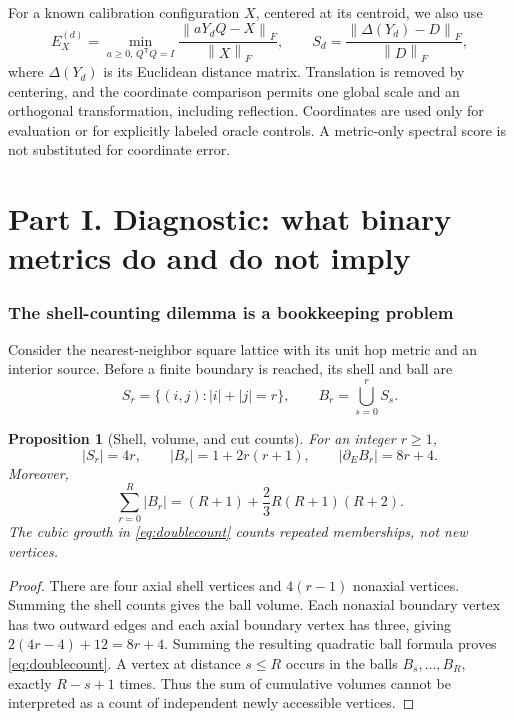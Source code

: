 \documentclass[11pt,letterpaper]{article}
\newtheorem{proposition}[theorem]{Proposition}
\theoremstyle{definition}
\theoremstyle{remark}
\newcommand{\norm}[1]{\left\lVert #1\right\rVert}
\begin{document}
For a known calibration configuration $X$, centered at its centroid, we also use
\begin{equation}
 E_X^{(d)}=\min_{a\geq0,\,Q^{\mathsf T}Q=I}
 \frac{\norm{aY_dQ-X}_F}{\norm{X}_F},\qquad
 S_d=\frac{\norm{\Delta(Y_d)-D}_F}{\norm{D}_F},
 \label{eq:errors}
\end{equation}
where $\Delta(Y_d)$ is its Euclidean distance matrix. Translation is removed by centering, and the coordinate comparison permits one global scale and an orthogonal transformation, including reflection. Coordinates are used only for evaluation or for explicitly labeled oracle controls. A metric-only spectral score is not substituted for coordinate error.

\part*{Part I. Diagnostic: what binary metrics do and do not imply}

\section{The shell-counting dilemma is a bookkeeping problem}\label{sec:shell}
Consider the nearest-neighbor square lattice with its unit hop metric and an interior source. Before a finite boundary is reached, its shell and ball are
\begin{equation}
 S_r=\{(i,j):|i|+|j|=r\},\qquad B_r=\bigcup_{s=0}^r S_s.
\end{equation}

\begin{proposition}[Shell, volume, and cut counts]\label{prop:shell}
For an integer $r\geq1$,
\begin{equation}
 |S_r|=4r,\qquad |B_r|=1+2r(r+1),\qquad
 |\partial_E B_r|=8r+4.
 \label{eq:shell}
\end{equation}
Moreover,
\begin{equation}
 \sum_{r=0}^{R}|B_r|=(R+1)+\frac23R(R+1)(R+2).
 \label{eq:doublecount}
\end{equation}
The cubic growth in \eqref{eq:doublecount} counts repeated memberships, not new vertices.
\end{proposition}
\begin{proof}
There are four axial shell vertices and $4(r-1)$ nonaxial vertices. Summing the shell counts gives the ball volume. Each nonaxial boundary vertex has two outward edges and each axial boundary vertex has three, giving $2(4r-4)+12=8r+4$. Summing the resulting quadratic ball formula proves \eqref{eq:doublecount}. A vertex at distance $s\leq R$ occurs in the balls $B_s,\ldots,B_R$, exactly $R-s+1$ times. Thus the sum of cumulative volumes cannot be interpreted as a count of independent newly accessible vertices.
\end{proof}
\end{document}
